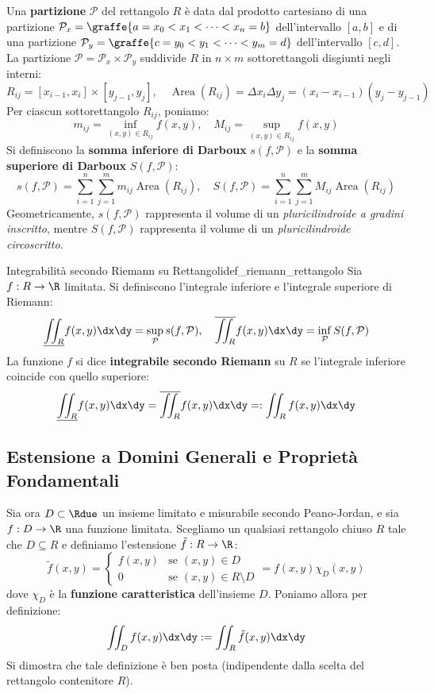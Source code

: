 Una \textbf{partizione} $\mathcal{P}$ del rettangolo $R$ è data dal prodotto cartesiano di una partizione $\mathcal{P}_x = \graffe{a = x_0 < x_1 < \dots < x_n = b}$ dell'intervallo $[a,b]$ e di una partizione $\mathcal{P}_y = \graffe{c = y_0 < y_1 < \dots < y_m = d}$ dell'intervallo $[c,d]$. La partizione $\mathcal{P} = \mathcal{P}_x \times \mathcal{P}_y$ suddivide $R$ in $n \times m$ sottorettangoli disgiunti negli interni:
\[
R_{ij} = [x_{i-1}, x_i] \times [y_{j-1}, y_j], \quad \operatorname{Area}(R_{ij}) = \Delta x_i \Delta y_j = (x_i - x_{i-1})(y_j - y_{j-1})
\]
Per ciascun sottorettangolo $R_{ij}$, poniamo:
\[
m_{ij} = \inf_{(x,y) \in R_{ij}} f(x,y), \quad M_{ij} = \sup_{(x,y) \in R_{ij}} f(x,y)
\]
Si definiscono la \textbf{somma inferiore di Darboux} $s(f, \mathcal{P})$ e la \textbf{somma superiore di Darboux} $S(f, \mathcal{P})$:
\[
s(f, \mathcal{P}) = \sum_{i=1}^n \sum_{j=1}^m m_{ij} \operatorname{Area}(R_{ij}), \quad S(f, \mathcal{P}) = \sum_{i=1}^n \sum_{j=1}^m M_{ij} \operatorname{Area}(R_{ij})
\]
Geometricamente, $s(f, \mathcal{P})$ rappresenta il volume di un \textit{pluricilindroide a gradini inscritto}, mentre $S(f, \mathcal{P})$ rappresenta il volume di un \textit{pluricilindroide circoscritto}.

\begin{definizione}{Integrabilità secondo Riemann su Rettangoli}{def_riemann_rettangolo}
Sia $f: R \to \R$ limitata. Si definiscono l'integrale inferiore e l'integrale superiore di Riemann:
\[
\underline{\iint_R} f(x,y) \dx\dy = \sup_{\mathcal{P}} s(f, \mathcal{P}), \quad \overline{\iint_R} f(x,y) \dx\dy = \inf_{\mathcal{P}} S(f, \mathcal{P})
\]
La funzione $f$ si dice \textbf{integrabile secondo Riemann} su $R$ se l'integrale inferiore coincide con quello superiore:
\[
\underline{\iint_R} f(x,y) \dx\dy = \overline{\iint_R} f(x,y) \dx\dy =: \iint_R f(x,y) \dx\dy
\]
\end{definizione}

\subsection{Estensione a Domini Generali e Proprietà Fondamentali}

Sia ora $D \subset \Rdue$ un insieme limitato e misurabile secondo Peano-Jordan, e sia $f: D \to \R$ una funzione limitata. Scegliamo un qualsiasi rettangolo chiuso $R$ tale che $D \subseteq R$ e definiamo l'estensione $\tilde{f}: R \to \R$:
\[
\tilde{f}(x,y) = \begin{cases} f(x,y) & \text{se } (x,y) \in D \\ 0 & \text{se } (x,y) \in R \setminus D \end{cases} = f(x,y) \chi_D(x,y)
\]
dove $\chi_D$ è la \textbf{funzione caratteristica} dell'insieme $D$. Poniamo allora per definizione:
\[
\iint_D f(x,y) \dx\dy := \iint_R \tilde{f}(x,y) \dx\dy
\]
Si dimostra che tale definizione è ben posta (indipendente dalla scelta del rettangolo contenitore $R$).

